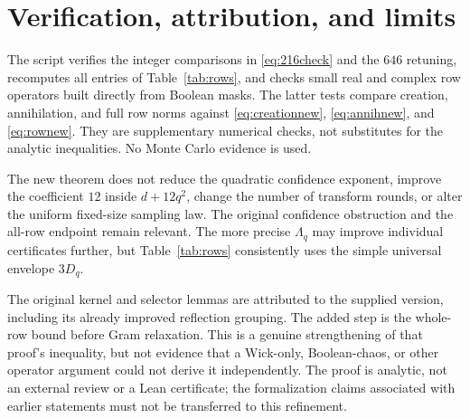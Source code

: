 \documentclass[11pt]{article}
\numberwithin{equation}{section}
\theoremstyle{definition}\newtheorem{definition}[theorem]{Definition}
\theoremstyle{remark}\newtheorem{remark}[theorem]{Remark}
\begin{document}
\section{Verification, attribution, and limits}
\label{sec:limits}
The script  verifies the integer comparisons in \eqref{eq:216check} and the $646$ retuning, recomputes all entries of Table~\ref{tab:rows}, and checks small real and complex row operators built directly from Boolean masks. The latter tests compare creation, annihilation, and full row norms against \eqref{eq:creationnew}, \eqref{eq:annihnew}, and \eqref{eq:rownew}. They are supplementary numerical checks, not substitutes for the analytic inequalities. No Monte Carlo evidence is used.

The new theorem does not reduce the quadratic confidence exponent, improve the coefficient $12$ inside $d+12q^2$, change the number of transform rounds, or alter the uniform fixed-size sampling law. The original confidence obstruction and the all-row endpoint remain relevant. The more precise $\Lambda_q$ may improve individual certificates further, but Table~\ref{tab:rows} consistently uses the simple universal envelope $3D_q$.

The original kernel and selector lemmas are attributed to the supplied version, including its already improved reflection grouping. The added step is the whole-row bound before Gram relaxation. This is a genuine strengthening of that proof's inequality, but not evidence that a Wick-only, Boolean-chaos, or other operator argument could not derive it independently. The proof is analytic, not an external review or a Lean certificate; the formalization claims associated with earlier statements must not be transferred to this refinement.
\end{document}
